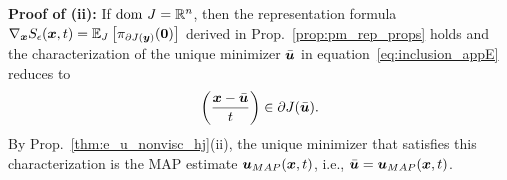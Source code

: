 \textbf{Proof of (ii):} If $\mathrm{dom~} J = \mathbb{R}^n$, then the representation formula $\nabla_{\boldsymbol{x}}S_\epsilon(\boldsymbol{x},t) = \mathbb{E}_{J}\left [{\pi_{\partial J(\boldsymbol{y})}(\boldsymbol{0})}\right]$ derived in Prop.~\ref{prop:pm_rep_props} holds and the characterization of the unique minimizer $\bar{\boldsymbol{u}}$ in equation~\eqref{eq:inclusion_appE} reduces to 
\[
\left(\frac{\boldsymbol{x} - \bar{\boldsymbol{u}}}{t}\right)\in \partial J(\bar{\boldsymbol{u}}).
\]
By Prop.~\ref{thm:e_u_nonvisc_hj}(ii), the unique minimizer that satisfies this characterization is the MAP estimate $\boldsymbol{u}_{MAP}(\boldsymbol{x},t)$, i.e., $\bar{\boldsymbol{u}} = \boldsymbol{u}_{MAP}(\boldsymbol{x},t)$.